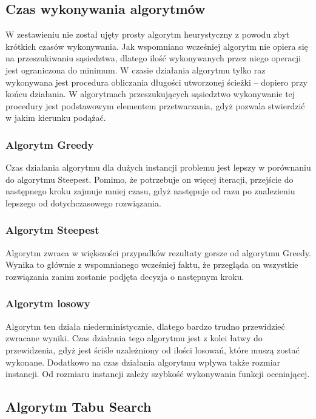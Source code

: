 \subsection{Czas wykonywania algorytmów}

W zestawieniu nie został ujęty prosty algorytm heurystyczny z
powodu zbyt krótkich czasów wykonywania. Jak wspomniano wcześniej
algorytm nie opiera się na przeszukiwaniu sąsiedztwa, dlatego
ilość wykonywanych przez niego operacji jest ograniczona do
minimum. W czasie działania algorytmu tylko raz wykonywana
jest procedura obliczania długości utworzonej ścieżki -- dopiero
przy końcu działania. W algorytmach przeszukujących sąsiedztwo
wykonywanie tej procedury jest podstawowym elementem przetwarzania,
gdyż pozwala stwierdzić w jakim kierunku podążać.


\subsubsection{Algorytm Greedy}

Czas działania algorytmu dla dużych instancji problemu jest lepszy
w porównaniu do algorytmu Steepest. Pomimo, że potrzebuje on
więcej iteracji, przejście do następnego kroku
zajmuje mniej czasu, gdyż następuje od razu po znalezieniu
lepszego od dotychczasowego rozwiązania.

\subsubsection{Algorytm Steepest}

Algorytm zwraca w większości przypadków rezultaty gorsze
od algorytmu Greedy. Wynika to głównie z wspomnianego
wcześniej faktu, że przegląda on
wszystkie rozwiązania zanim zostanie podjęta decyzja o następnym kroku.

\subsubsection{Algorytm losowy}

Algorytm ten działa niederministycznie, dlatego bardzo trudno
przewidzieć zwracane wyniki. Czas działania tego algorytmu
jest z kolei łatwy do przewidzenia, gdyż jest ściśle uzależniony
od ilości losowań, które muszą zostać wykonane. Dodatkowo na czas
działania algorytmu wpływa także rozmiar instancji. Od rozmiaru
instancji zależy szybkość wykonywania funkcji oceniającej.

\subsection {Algorytm Tabu Search}



